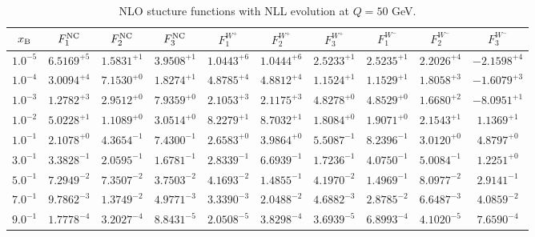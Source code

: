 \begin{table}[h]
\begin{adjustbox}{width=\textwidth}
\begin{tabular}{|c||c|c|c|c|c|c|c|c|c|}
\hline
$x_{\rm B}$ & $F_1^{\rm NC}$ & $F_2^{\rm NC}$ & $F_3^{\rm NC}$ & $F_1^{W^+}$ & $F_2^{W^+}$ & $F_3^{W^+}$ & $F_1^{W^-}$ & $F_2^{W^-}$ & $F_3^{W^-}$ \\
\hline
$ 1.0^{-5}$ & $ 6.5169^{+5}$ & $ 1.5831^{+1}$ & $ 3.9508^{+1}$ & $ 1.0443^{+6}$ & $ 1.0444^{+6}$ & $ 2.5233^{+1}$ & $ 2.5235^{+1}$ & $ 2.2026^{+4}$ & $-2.1598^{+4}$ \\
$ 1.0^{-4}$ & $ 3.0094^{+4}$ & $ 7.1530^{+0}$ & $ 1.8274^{+1}$ & $ 4.8785^{+4}$ & $ 4.8812^{+4}$ & $ 1.1524^{+1}$ & $ 1.1529^{+1}$ & $ 1.8058^{+3}$ & $-1.6079^{+3}$ \\
$ 1.0^{-3}$ & $ 1.2782^{+3}$ & $ 2.9512^{+0}$ & $ 7.9359^{+0}$ & $ 2.1053^{+3}$ & $ 2.1175^{+3}$ & $ 4.8278^{+0}$ & $ 4.8529^{+0}$ & $ 1.6680^{+2}$ & $-8.0951^{+1}$ \\
$ 1.0^{-2}$ & $ 5.0228^{+1}$ & $ 1.1089^{+0}$ & $ 3.0514^{+0}$ & $ 8.2279^{+1}$ & $ 8.7032^{+1}$ & $ 1.8084^{+0}$ & $ 1.9071^{+0}$ & $ 2.1543^{+1}$ & $ 1.1369^{+1}$ \\
$ 1.0^{-1}$ & $ 2.1078^{+0}$ & $ 4.3654^{-1}$ & $ 7.4300^{-1}$ & $ 2.6583^{+0}$ & $ 3.9864^{+0}$ & $ 5.5087^{-1}$ & $ 8.2396^{-1}$ & $ 3.0120^{+0}$ & $ 4.8797^{+0}$ \\
$ 3.0^{-1}$ & $ 3.3828^{-1}$ & $ 2.0595^{-1}$ & $ 1.6781^{-1}$ & $ 2.8339^{-1}$ & $ 6.6939^{-1}$ & $ 1.7236^{-1}$ & $ 4.0750^{-1}$ & $ 5.0084^{-1}$ & $ 1.2251^{+0}$ \\
$ 5.0^{-1}$ & $ 7.2949^{-2}$ & $ 7.3507^{-2}$ & $ 3.7503^{-2}$ & $ 4.1693^{-2}$ & $ 1.4855^{-1}$ & $ 4.1970^{-2}$ & $ 1.4969^{-1}$ & $ 8.0977^{-2}$ & $ 2.9141^{-1}$ \\
$ 7.0^{-1}$ & $ 9.7862^{-3}$ & $ 1.3749^{-2}$ & $ 4.9771^{-3}$ & $ 3.3390^{-3}$ & $ 2.0488^{-2}$ & $ 4.6882^{-3}$ & $ 2.8785^{-2}$ & $ 6.6487^{-3}$ & $ 4.0859^{-2}$ \\
$ 9.0^{-1}$ & $ 1.7778^{-4}$ & $ 3.2027^{-4}$ & $ 8.8431^{-5}$ & $ 2.0508^{-5}$ & $ 3.8298^{-4}$ & $ 3.6939^{-5}$ & $ 6.8993^{-4}$ & $ 4.1020^{-5}$ & $ 7.6590^{-4}$ \\
\hline
\end{tabular}
\end{adjustbox}\caption{NLO stucture functions with NLL evolution at $Q = 50$ GeV.}
\label{tab:N1LO-Q50}
\end{table}


